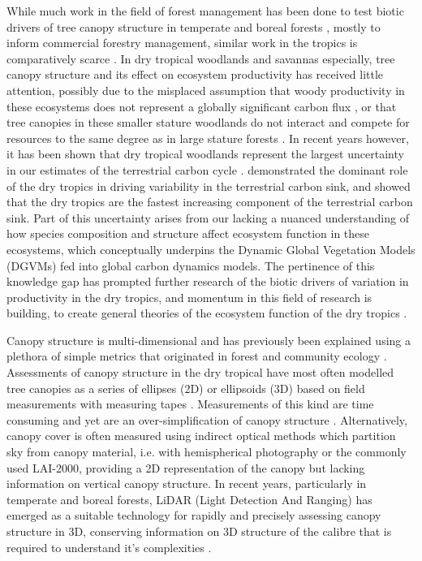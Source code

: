 \documentclass[11pt,a4paper]{article}
\begin{document}
While much work in the field of forest management has been done to test biotic drivers of tree canopy structure in temperate \citep{} and boreal forests \citep{}, mostly to inform commercial forestry management, similar work in the tropics is comparatively scarce \citep{}. In dry tropical woodlands and savannas especially, tree canopy structure and its effect on ecosystem productivity has received little attention, possibly due to the misplaced assumption that woody productivity in these ecosystems does not represent a globally significant carbon flux \citep{}, or that tree canopies in these smaller stature woodlands do not interact and compete for resources to the same degree as in large stature forests \citep{}. In recent years however, it has been shown that dry tropical woodlands represent the largest uncertainty in our estimates of the terrestrial carbon cycle \citep{Quere2018, Ahlstrom2015}. \citet{Sitch2015} demonstrated the dominant role of the dry tropics in driving variability in the terrestrial carbon sink, and showed that the dry tropics are the fastest increasing component of the terrestrial carbon sink. Part of this uncertainty arises from our lacking a nuanced understanding of how species composition and structure affect ecosystem function in these ecosystems, which conceptually underpins the Dynamic Global Vegetation Models (DGVMs) fed into global carbon dynamics models. The pertinence of this knowledge gap has prompted further research of the biotic drivers of variation in productivity in the dry tropics, and momentum in this field of research is building, to create general theories of the ecosystem function of the dry tropics \citep{}.

Canopy structure is multi-dimensional and has previously been explained using a plethora of simple metrics that originated in forest and community ecology \citep{}. Assessments of canopy structure in the dry tropical have most often modelled tree canopies as a series of ellipses (2D) or ellipsoids (3D) based on field measurements with measuring tapes \citep{}. Measurements of this kind are time consuming and yet are an over-simplification of canopy structure \citep{}. Alternatively, canopy cover is often measured using indirect optical methods which partition sky from canopy material, i.e. with hemispherical photography or the commonly used LAI-2000, providing a 2D representation of the canopy but lacking information on vertical canopy structure. In recent years, particularly in temperate and boreal forests, LiDAR (Light Detection And Ranging) has emerged as a suitable technology for rapidly and precisely assessing canopy structure in 3D, conserving information on 3D structure of the calibre that is required to understand it's complexities \citep{}.
\end{document}
